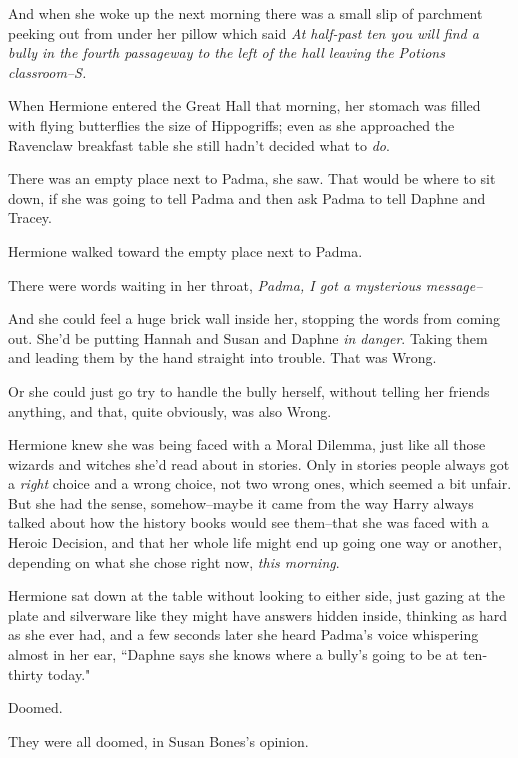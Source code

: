 And when she woke up the next morning there was a small slip of parchment peeking out from under her pillow which said \emph{At half-past ten you will find a bully in the fourth passageway to the left of the hall leaving the Potions classroom\---S.}

\later

When Hermione entered the Great Hall that morning, her stomach was filled with flying butterflies the size of Hippogriffs; even as she approached the Ravenclaw breakfast table she still hadn't decided what to \emph{do}.

There was an empty place next to Padma, she saw. That would be where to sit down, if she was going to tell Padma and then ask Padma to tell Daphne and Tracey.

Hermione walked toward the empty place next to Padma.

There were words waiting in her throat, \emph{Padma, I got a \emph{mysterious} message\---}

And she could feel a huge brick wall inside her, stopping the words from coming out. She'd be putting Hannah and Susan and Daphne \emph{in danger}. Taking them and leading them by the hand straight into trouble. That was Wrong.

Or she could just go try to handle the bully herself, without telling her friends anything, and that, quite obviously, was also Wrong.

Hermione knew she was being faced with a Moral Dilemma, just like all those wizards and witches she'd read about in stories. Only in stories people always got a \emph{right} choice and a wrong choice, not two wrong ones, which seemed a bit unfair. But she had the sense, somehow\---maybe it came from the way Harry always talked about how the history books would see them\---that she was faced with a Heroic Decision, and that her whole life might end up going one way or another, depending on what she chose right now, \emph{this morning}.

Hermione sat down at the table without looking to either side, just gazing at the plate and silverware like they might have answers hidden inside, thinking as hard as she ever had, and a few seconds later she heard Padma's voice whispering almost in her ear, ``Daphne says she knows where a bully's going to be at ten-thirty today."

\later

Doomed.

They were all doomed, in Susan Bones's opinion.

